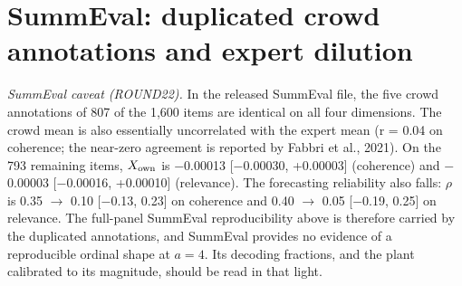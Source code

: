 \documentclass[10pt,twocolumn]{article}
\begin{document}
\section{SummEval: duplicated crowd annotations and expert dilution}

\emph{SummEval caveat (ROUND22).} In the released SummEval file, the five crowd annotations of 807 of the 1,600 items are identical on all four dimensions. The crowd mean is also essentially uncorrelated with the expert mean (r = 0.04 on coherence; the near-zero agreement is reported by Fabbri et al., 2021). On the 793 remaining items, \(X_{\rm own}\) is $-$0.00013 {[}$-$0.00030, +0.00003{]} (coherence) and $-$0.00003 {[}$-$0.00016, +0.00010{]} (relevance). The forecasting reliability also falls: $\rho$ is 0.35 $\rightarrow$ 0.10 {[}$-$0.13, 0.23{]} on coherence and 0.40 $\rightarrow$ 0.05 {[}$-$0.19, 0.25{]} on relevance. The full-panel SummEval reproducibility above is therefore carried by the duplicated annotations, and SummEval provides no evidence of a reproducible ordinal shape at \(a=4\). Its decoding fractions, and the plant calibrated to its magnitude, should be read in that light.
\end{document}
